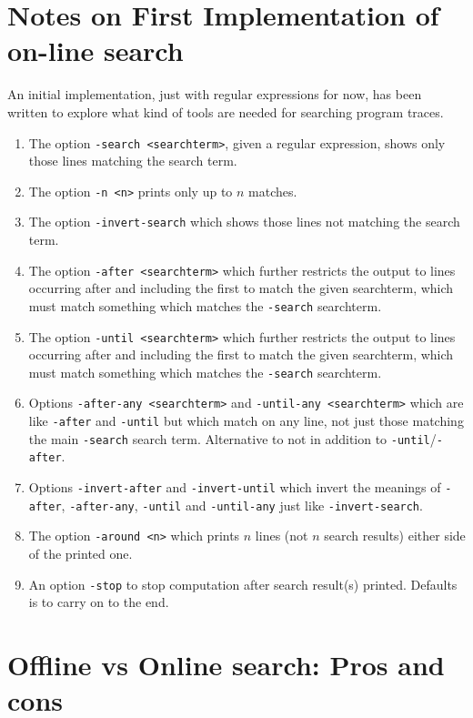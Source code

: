 \documentclass[10pt]{article}
\begin{document}
\section{Notes on First Implementation of on-line search}

An initial implementation, just with regular expressions for now, has been written to explore what kind of tools are needed for searching program traces.

\begin{enumerate}
\item The option \texttt{-search <searchterm>}, given a regular expression, shows only those lines matching the search term.
\item The option \texttt{-n <n>} prints only up to $n$ matches.
\item The option \texttt{-invert-search} which shows those lines not matching the search term.
\item The option \texttt{-after <searchterm>} which further restricts the output to lines occurring after and including the first to match the given searchterm, which must match something which matches the \texttt{-search} searchterm.
\item The option \texttt{-until <searchterm>} which further restricts the output to lines occurring after and including the first to match the given searchterm, which must match something which matches the \texttt{-search} searchterm. 
\item Options \texttt{-after-any <searchterm>} and \texttt{-until-any <searchterm>} which are like \texttt{-after} and \texttt{-until} but which match on any line, not just those matching the main \texttt{-search} search term. Alternative to not in addition to \texttt{-until}/\texttt{-after}.
\item Options \texttt{-invert-after} and \texttt{-invert-until} which invert the meanings of \texttt{-after}, \texttt{-after-any}, \texttt{-until} and \texttt{-until-any} just like \texttt{-invert-search}.
\item The option \texttt{-around <n>} which prints $n$ lines (not $n$ search results) either side of the printed one.
\item An option \texttt{-stop} to stop computation after search result(s) printed. Defaults is to carry on to the end.
\end{enumerate}

\section{Offline vs Online search: Pros and cons}
\end{document}
